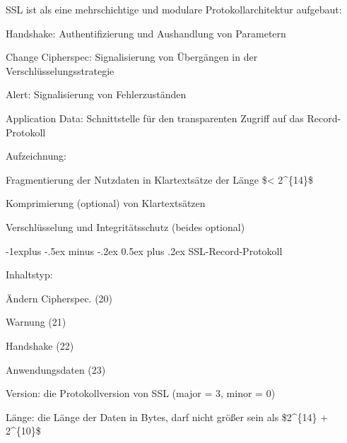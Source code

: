 \documentclass[a4paper]{article}
\makeatletter
\renewcommand{\subsection}{\@startsection{subsection}{2}{0mm}%
 {-1explus -.5ex minus -.2ex}%
 {0.5ex plus .2ex}%
 {\normalfont\normalsize\bfseries}}
\makeatother
\begin{document}
\begin{multicols}{3}
\begin{itemize*}

            \begin{itemize*}
                  \item
                  SSL ist als eine mehrschichtige und modulare Protokollarchitektur
                  aufgebaut:

                  \begin{itemize*}
                        \item Handshake: Authentifizierung und Aushandlung von Parametern
                        \item Change Cipherspec: Signalisierung von Übergängen in der Verschlüsselungsstrategie
                        \item Alert: Signalisierung von Fehlerzuständen
                        \item Application Data: Schnittstelle für den transparenten Zugriff auf das Record-Protokoll
                        \item Aufzeichnung:
                        \begin{itemize*} \item Fragmentierung der Nutzdaten in Klartextsätze der Länge \$\textless{} 2\^{}\{14\}\$ \item Komprimierung (optional) von Klartextsätzen \item Verschlüsselung und Integritätsschutz (beides optional) \end{itemize*}
                  \end{itemize*}
            \end{itemize*}


            \subsection{SSL-Record-Protokoll}


            \begin{itemize*}
                  \item
                  Inhaltstyp:

                  \begin{itemize*}
                        \item Ändern Cipherspec. (20)
                        \item Warnung (21)
                        \item Handshake (22)
                        \item Anwendungsdaten (23)
                  \end{itemize*}
                  \item
                  Version: die Protokollversion von SSL (major = 3, minor = 0)
                  \item
                  Länge: die Länge der Daten in Bytes, darf nicht größer sein als
                  \$2\^{}\{14\} + 2\^{}\{10\}\$
            \end{itemize*}



\end{itemize*}
\end{multicols}
\end{document}
